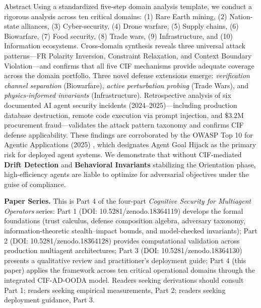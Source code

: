 \documentclass[
  ignorenonframetext,
]{beamer}
\begin{document}
\begin{frame}[allowframebreaks]{Abstract}
Using a standardized five-step domain analysis template, we conduct a
rigorous analysis across ten critical domains: (1) Rare Earth mining,
(2) Nation-state alliances, (3) Cyber-security, (4) Drone warfare, (5)
Supply chains, (6) Biowarfare, (7) Food security, (8) Trade wars, (9)
Infrastructure, and (10) Information ecosystems. Cross-domain synthesis
reveals three universal attack patterns---FR Polarity Inversion,
Constraint Relaxation, and Context Boundary Violation---and confirms
that all five CIF mechanisms provide adequate coverage across the domain
portfolio. Three novel defense extensions emerge: \emph{verification
channel separation} (Biowarfare), \emph{active perturbation probing}
(Trade Wars), and \emph{physics-informed invariants} (Infrastructure).
Retrospective analysis of six documented AI agent security incidents
(2024--2025)---including production database destruction, remote code
execution via prompt injection, and \$3.2M procurement fraud---validates
the attack pattern taxonomy and confirms CIF defense applicability.
These findings are corroborated by the OWASP Top 10 for Agentic
Applications (2025) \cite{owasp2025agentic}, which designates Agent Goal
Hijack as the primary risk for deployed agent systems. We demonstrate
that without CIF-mediated \textbf{Drift Detection} and
\textbf{Behavioral Invariants} stabilizing the Orientation phase,
high-efficiency agents are liable to optimize for adversarial objectives
under the guise of compliance.

\textbf{Paper Series.} This is Part 4 of the four-part \emph{Cognitive
Security for Multiagent Operators} series: Part 1 (DOI:
10.5281/zenodo.18364119) develops the formal foundations (trust
calculus, defense composition algebra, adversary taxonomy,
information-theoretic stealth--impact bounds, and model-checked
invariants); Part 2 (DOI: 10.5281/zenodo.18364128) provides
computational validation across production multiagent architectures;
Part 3 (DOI: 10.5281/zenodo.18364130) presents a qualitative review and
practitioner's deployment guide; Part 4 (this paper) applies the
framework across ten critical operational domains through the integrated
CIF-AD-OODA model. Readers seeking derivations should consult Part 1;
readers seeking empirical measurements, Part 2; readers seeking
deployment guidance, Part 3.
\end{frame}
\end{document}

